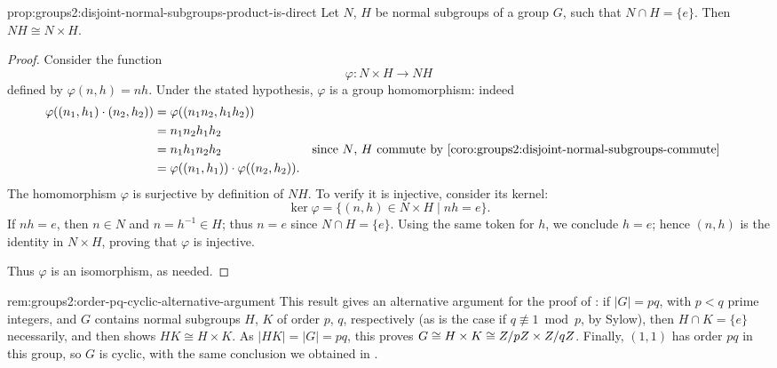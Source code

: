 \begin{prop}{}{prop:groups2:disjoint-normal-subgroups-product-is-direct}
  Let $N$, $H$ be normal subgroups of a group $G$, such that
  $N \cap H = \{e\}$. Then $NH \cong N \times H$.
\end{prop}
\begin{proof}
  Consider the function
  \[\varphi : N \times H \to NH\]
  defined by $\varphi(n, h) = nh$. Under the stated hypothesis,
  $\varphi$ is a group homomorphism: indeed
  \begin{align*}
    \varphi((n_1, h_1) \cdot (n_2, h_2))
    &= \varphi((n_1 n_2, h_1 h_2)) \\
    &= n_1 n_2 h_1 h_2 \\
    &= n_1 h_1 n_2 h_2
    && \text{since $N$, $H$ commute by \Cref{coro:groups2:disjoint-normal-subgroups-commute}} \\
    &= \varphi((n_1, h_1)) \cdot \varphi((n_2, h_2)).
  \end{align*}
  The homomorphism $\varphi$ is surjective by definition of $NH$. To
  verify it is injective, consider its kernel:
  \[\ker\varphi = \{(n, h) \in N \times H \mid nh = e\}.\]
  If $nh = e$, then $n \in N$ and $n = h^{-1} \in H$; thus $n = e$
  since $N \cap H = \{e\}$. Using the same token for $h$, we conclude
  $h = e$; hence $(n, h)$ is the identity in $N \times H$, proving
  that $\varphi$ is injective.

  Thus $\varphi$ is an isomorphism, as needed.
\end{proof}
\begin{rem}{}{rem:groups2:order-pq-cyclic-alternative-argument}
  This result gives an alternative argument for the proof of
  : if $|G| = pq$, with $p < q$
  prime integers, and $G$ contains normal subgroups $H$, $K$ of order
  $p$, $q$, respectively (as is the case if $q \not\equiv 1 \bmod p$,
  by Sylow), then $H \cap K = \{e\}$ necessarily, and then
   shows $HK \cong H \times K$. As
  $|HK| = |G| = pq$, this proves
  $G \cong H \times K \cong Z/pZ \times Z/qZ$. Finally, $(1, 1)$
  has order $pq$ in this group, so $G$ is cyclic, with the same
  conclusion we obtained in .
\end{rem}

